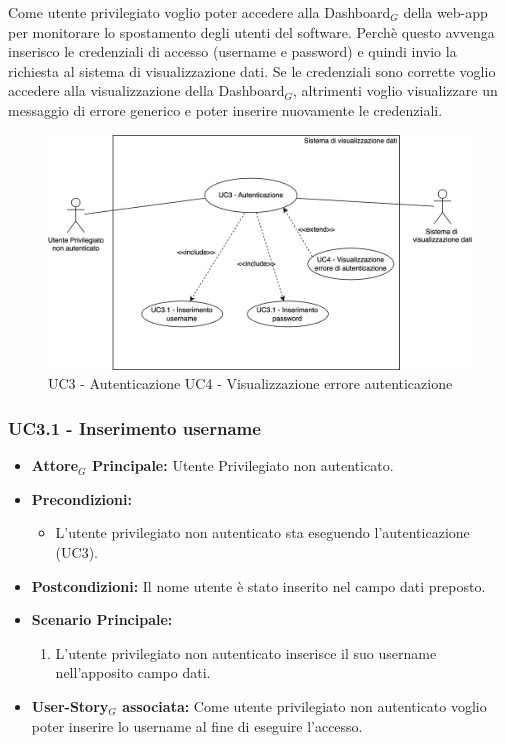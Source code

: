 \documentclass[11pt]{article}
\begin{document}
\begin{justify}
\begin{itemize}
     Come utente privilegiato voglio poter accedere alla Dashboard$_G$ della web-app per monitorare lo spostamento degli utenti del software. Perchè questo avvenga inserisco le credenziali di accesso (username e password) e quindi invio la richiesta al sistema di visualizzazione dati. Se le credenziali sono corrette voglio accedere alla visualizzazione della Dashboard$_G$, 
     altrimenti voglio visualizzare un messaggio di errore generico e poter inserire nuovamente le credenziali.
\end{itemize}
\begin{figure}[H]
    \centering
    \includegraphics[width=0.7\linewidth]{UC3.12_UC4image.png}
    \caption{UC3 - Autenticazione\newline
    UC4 - Visualizzazione errore autenticazione}
    \label{fig:UC3 e UC4}
\end{figure}
\subsubsection{\textbf{UC3.1 - Inserimento username}}
\begin{itemize}
     \item \textbf{Attore$_G$ Principale:} Utente Privilegiato non autenticato.
     \item \textbf{Precondizioni:} 
            \begin{itemize}
                \item L'utente privilegiato non autenticato sta eseguendo l'autenticazione (UC3).
            \end{itemize}
     \item \textbf{Postcondizioni:} Il nome utente è stato inserito nel campo dati preposto.
     \item \textbf{Scenario Principale:}
        \begin{enumerate}
            \item L'utente privilegiato non autenticato inserisce il suo username nell'apposito campo dati.
        \end{enumerate}
     \item \textbf{User-Story$_G$ associata:} Come utente privilegiato non autenticato  voglio poter inserire lo username al fine di eseguire l'accesso.
\end{itemize}

\end{justify}
\end{document}
